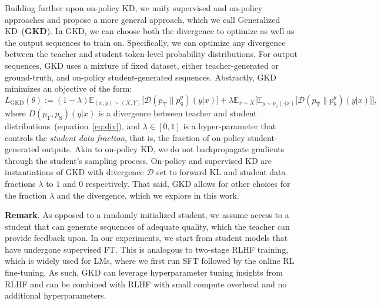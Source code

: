 \documentclass{article} %
\def\eqref#1{equation~\ref{#1}}
\newcommand{\E}{\mathbb{E}}
\def\D{\mathcal{D}}
\newcommand{\stu}[0]{p_{\text{S}}}
\newcommand{\tea}[0]{p_{\text{T}}}
\newcommand{\addtext}[1]{#1}
\begin{document}
Building further upon on-policy KD, we unify supervised and on-policy approaches and propose a more general approach, which we call Generalized KD~(\textbf{GKD}).
In GKD, we can choose both the divergence to optimize as well as the output sequences to train on. Specifically, we can optimize any divergence between the  teacher and student token-level probability distributions. For output sequences, GKD uses a mixture of fixed dataset, either teacher-generated or ground-truth, and on-policy student-generated sequences. Abstractly, GKD minimizes an objective of the form:
\begin{equation*}
    \boxed{L_\mathrm{GKD}(\theta) := (1 - \lambda)  \E_{(x, y) \sim (X, Y)} \big[ \D(\tea \| \stu^\theta)(y|x) \big] + \lambda \E_{x\sim X} \Big[\E_{y \sim \stu(\cdot|x)} \big[\D(\tea \| \stu^\theta)(y|x)\big]\Big]},
\end{equation*}
where $D(\tea, \stu)(y|x)$ is a divergence between teacher and student distributions~(\eqref{eq:div}), and $\lambda \in [0, 1]$ is a hyper-parameter that controls the \emph{student data fraction}, that is, the fraction of on-policy student-generated outputs. Akin to on-policy KD, we do not backpropagate gradients through the student's sampling process. On-policy and supervised KD are instantiations of GKD with divergence $\D$ set to forward KL and student data fractions $\lambda$ to $1$ and $0$ respectively.
That said, GKD allows for other choices for the fraction $\lambda$ and the divergence, which we explore in this work. 


\textbf{Remark}. As opposed to a randomly initialized student, we assume access to a student that can generate sequences of adequate quality, which the teacher can provide feedback upon. In our experiments, we start from student models that have undergone supervised FT. \addtext{This is analogous to two-stage RLHF training, which is widely used for LMs, where we first run SFT followed by the online RL fine-tuning. As such, GKD can leverage hyperparameter tuning insights from RLHF and can be combined with RLHF with small compute overhead and no additional hyperparameters.}
\end{document}
